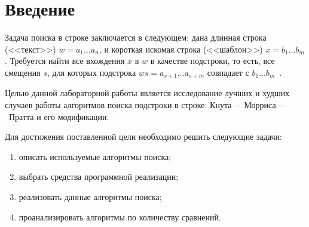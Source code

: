 \chapter*{Введение}
Задача поиска в строке заключается в следующем: дана длинная строка (<<текст>>) $w = a_1 \dots a_n$, и короткая искомая строка (<<шаблон>>) $x = b_1 \dots b_m$. Требуется найти все вхождения $x$ в $w$ в качестве подстроки, то есть, все смещения $s$, для которых подстрока $ws = a_{s + 1} \dots a_{s + m}$ совпадает с $b_1 \dots b_m$~\cite{lectures1}.

Целью данной лабораторной работы является исследование лучших и худших случаев работы алгоритмов поиска подстроки в строке: Кнута~--~Морриса~--~Пратта и его модификации.

Для достижения поставленной цели необходимо решить следующие задачи:
\begin{enumerate}
	\item описать используемые алгоритмы поиска;
	\item выбрать средства программной реализации;
	\item реализовать данные алгоритмы поиска;
	\item проанализировать алгоритмы по количеству сравнений.
\end{enumerate}
